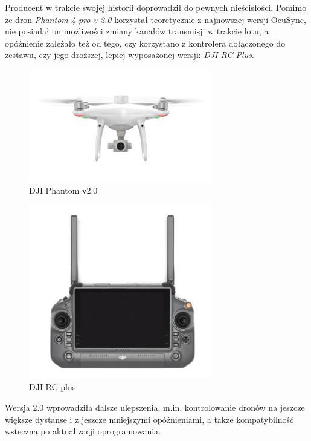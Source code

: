 Producent w trakcie swojej historii doprowadził do pewnych nieścisłości. Pomimo że dron \textit{Phantom 4 pro v 2.0} korzystał teoretycznie z najnowszej wersji OcuSync, nie posiadał on możliwości zmiany kanałów transmisji w trakcie lotu, a opóźnienie zależało też od tego, czy korzystano z kontrolera dołączonego do zestawu, czy jego droższej, lepiej wyposażonej wersji: \textit{DJI RC Plus}.
  
\begin{center}
\begin{figure}[!ht]
  \includegraphics[width=8cm]{./Obrazy/dji-phantom-v2.jpg}
  \caption{DJI Phantom v2.0}
  \end{figure}
\end{center}
  
  \begin{center}
\begin{figure}[!ht]
  \includegraphics[width=8cm]{./Obrazy/dji-rc-plus.png}
  \caption{DJI RC plus}
  \end{figure}
\end{center}
  
  

Wersja 2.0 wprowadziła dalsze ulepszenia, m.in. kontrolowanie dronów na jeszcze większe dystanse i z jeszcze mniejszymi opóźnieniami, a także kompatybilność wsteczną po aktualizacji oprogramowania.

